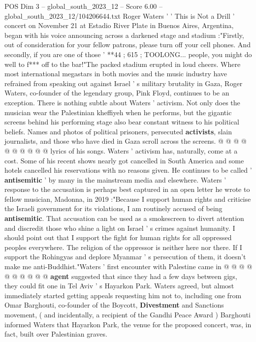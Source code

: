 \begin{textsample}{POS Dim 3 – global\_south\_2023\_12 – Score 6.00 – global\_south\_2023\_12/104206644.txt}  \label{ex:f3_pos_425}
Roger Waters ' ' This is Not a Drill ' concert on November 21 at Estadio River Plate in Buenos Aires, Argentina, began with his voice announcing across a darkened stage and stadium :"Firstly, out of consideration for your fellow patrons, please turn off your cell phones.
And secondly, if you are one of those ' **44 ; 615 ; TOOLONG... people, you might do well to f*** off to the bar!"The packed stadium erupted in loud cheers.
Where most international megastars in both movies and the music industry have refrained from speaking out against Israel ' s military brutality in Gaza, Roger Waters, co-founder of the legendary group, Pink Floyd, continues to be an exception.
There is nothing subtle about Waters ' activism.
Not only does the musician wear the Palestinian kheffiyeh when he performs, but the gigantic screens behind his performing stage also bear constant witness to his political beliefs.
Names and photos of political prisoners, persecuted \textbf{activists}, slain journalists, and those who have died in Gaza scroll across the screens. @ @ @ @ @ @ @ @ @ @ lyrics of his songs.
Waters ' activism has, naturally, come at a cost.
Some of his recent shows nearly got cancelled in South America and some hotels cancelled his reservations with no reasons given.
He continues to be called ' \textbf{antisemitic} ' by many in the mainstream media and elsewhere.
Waters ' response to the accusation is perhaps best captured in an open letter he wrote to fellow musician, Madonna, in 2019 :"Because I support human rights and criticise the Israeli government for its violations, I am routinely accused of being \textbf{antisemitic}.
That accusation can be used as a smokescreen to divert attention and discredit those who shine a light on Israel ' s crimes against humanity.
I should point out that I support the fight for human rights for all oppressed peoples everywhere.
The religion of the oppressor is neither here nor there.
If I support the Rohingyas and deplore Myanmar ' s persecution of them, it doesn't make me anti-Buddhist."Waters ' first encounter with Palestine came in @ @ @ @ @ @ @ @ @ @ \textbf{agent} suggested that since they had a few days between gigs, they could fit one in Tel Aviv ' s Hayarkon Park.
Waters agreed, but almost immediately started getting appeals requesting him not to, including one from Omar Barghouti, co-founder of the Boycott, \textbf{Divestment} and Sanctions movement, ( and incidentally, a recipient of the Gandhi Peace Award ) Barghouti informed Waters that Hayarkon Park, the venue for the proposed concert, was, in fact, built over Palestinian graves.

\end{textsample}
